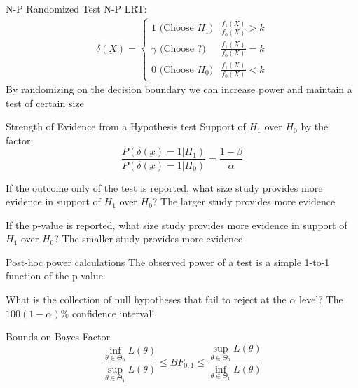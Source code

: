 \documentclass[avery5388,grid,frame]{flashcards}
\begin{document}
\begin{flashcard}[Definition]{N-P Randomized Test}
\bigskip\bigskip
N-P LRT:
{\begin{align*}
\delta(\underbar{X})=\begin{cases}
1\textrm{ (Choose $H_1$)}&\frac{f_1(X)}{f_0(X)}>k\\
\gamma\textrm{ (Choose ?)}&\frac{f_1(X)}{f_0(X)}=k\\
0\textrm{ (Choose $H_0$)}&\frac{f_1(X)}{f_0(X)}<k
\end{cases}
\end{align*}}
By randomizing on the decision boundary we can increase power and maintain a test of certain size
\end{flashcard}
\begin{flashcard}[Definition]{Strength of Evidence from a Hypothesis test}
\bigskip\bigskip\bigskip
Support of $H_1$ over $H_0$ by the factor:
\begin{equation*}
\frac{P(\delta(\underbar{x})=1|H_1)}{P(\delta(\underbar{x})=1|H_0)}=\frac{1-\beta}{\alpha}
\end{equation*}
\end{flashcard}
\begin{flashcard}{If the outcome only of the test is reported, what size study provides more evidence in support of $H_1$ over $H_0$?}
\bigskip\bigskip\bigskip\bigskip
The larger study provides more evidence
\end{flashcard}
\begin{flashcard}{If the p-value is reported, what size study provides more evidence in support of $H_1$ over $H_0$?}
\bigskip\bigskip\bigskip\bigskip
The smaller study provides more evidence
\end{flashcard}
\begin{flashcard}{Post-hoc power calculations}
\bigskip\bigskip\bigskip\bigskip
The observed power of a test is a simple 1-to-1 function of the p-value.
\end{flashcard}
\begin{flashcard}[Definition]{What is the collection of null hypotheses that fail to reject at the $\alpha$ level?}
\bigskip\bigskip\bigskip\bigskip
The $100(1-\alpha)\%$ confidence interval!
\end{flashcard}
\begin{flashcard}[Definition]{Bounds on Bayes Factor}
\bigskip\bigskip\bigskip\bigskip
\begin{equation*}
\frac{\inf_{\theta\in\Theta_0}L(\theta)}{\sup_{\theta\in\Theta_1}L(\theta)}\leq BF_{0,1}\leq\frac{\sup_{\theta\in\Theta_0}L(\theta)}{\inf_{\theta\in\Theta_1}L(\theta)}
\end{equation*}
\end{flashcard}
\end{document}
